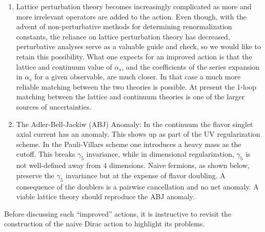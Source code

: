 \begin{enumerate}
\item Lattice perturbation theory becomes increasingly complicated as more
and more irrelevant operators are added to the action. Even though, with the
advent of non-perturbative methods for determining renormalization constants,
the reliance on lattice perturbation theory has decreased, perturbative
analyses serve as a valuable guide and check, so we would like to retain this
possibility. What one expects for an improved action is that the lattice and
continuum value of $\alpha_s$, and the coefficients of the series expansion
in $\alpha_s$ for a given observable, are much closer. In that case a much
more reliable matching between the two theories is possible. At present the
1-loop matching between the lattice and continuum theories is one of the
larger sources of uncertainties.

\item The Adler-Bell-Jackiw (ABJ) Anomaly: In the continuum the flavor
singlet axial current has an anomaly. This shows up as part of the UV
regularization scheme. In the Pauli-Villars scheme one introduces a heavy
mass as the cutoff. This breaks $\gamma_5$ invariance, while in dimensional
regularization, $\gamma_5$ is not well-defined away from 4 dimensions.
Naive fermions, as shown below, preserve the $\gamma_5$ invariance but at the
expense of flavor doubling. A consequence of the doublers is a pairwise
cancellation and no net anomaly. A viable lattice theory should reproduce the
ABJ anomaly.
\end{enumerate}

Before discussing such ``improved'' actions, it is instructive to revisit the
construction of the naive Dirac action to highlight its problems.
